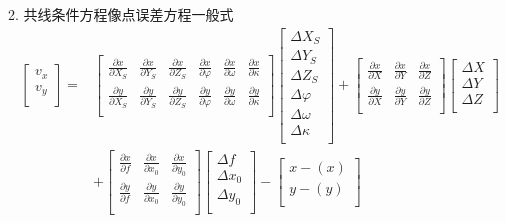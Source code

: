 \documentclass[a4paper]{ctexart}
\begin{document}
2. 共线条件方程像点误差方程一般式
\begin{align*}
\left[ \begin{array}{c}
	v_x\\
	v_y\\
\end{array} \right] =&\left[ \begin{matrix}
	\frac{\partial x}{\partial X_S}&		\frac{\partial x}{\partial Y_S}&		\frac{\partial x}{\partial Z_S}&		\frac{\partial x}{\partial \varphi}&		\frac{\partial x}{\partial \omega}&		\frac{\partial x}{\partial \kappa}\\
	\frac{\partial y}{\partial X_S}&		\frac{\partial y}{\partial Y_S}&		\frac{\partial y}{\partial Z_S}&		\frac{\partial y}{\partial \varphi}&		\frac{\partial y}{\partial \omega}&		\frac{\partial y}{\partial \kappa}\\
\end{matrix} \right] \left[ \begin{array}{c}
	\Delta X_S\\
	\Delta Y_S\\
	\Delta Z_S\\
	\Delta \varphi\\
	\Delta \omega\\
	\Delta \kappa\\
\end{array} \right] +\left[ \begin{matrix}
	\frac{\partial x}{\partial X}&		\frac{\partial x}{\partial Y}&		\frac{\partial x}{\partial Z}\\
	\frac{\partial y}{\partial X}&		\frac{\partial y}{\partial Y}&		\frac{\partial y}{\partial Z}\\
\end{matrix} \right] \left[ \begin{array}{c}
	\Delta X\\
	\Delta Y\\
	\Delta Z\\
\end{array} \right] \\
&+\left[ \begin{matrix}
	\frac{\partial x}{\partial f}&		\frac{\partial x}{\partial x_0}&		\frac{\partial x}{\partial y_0}\\
	\frac{\partial y}{\partial f}&		\frac{\partial y}{\partial x_0}&		\frac{\partial y}{\partial y_0}\\
\end{matrix} \right] \left[ \begin{array}{c}
	\Delta f\\
	\Delta x_0\\
	\Delta y_0\\
\end{array} \right] -\left[ \begin{array}{c}
	x-\left( x \right)\\
	y-\left( y \right)\\
\end{array} \right] 
\end{align*}
\end{document}
